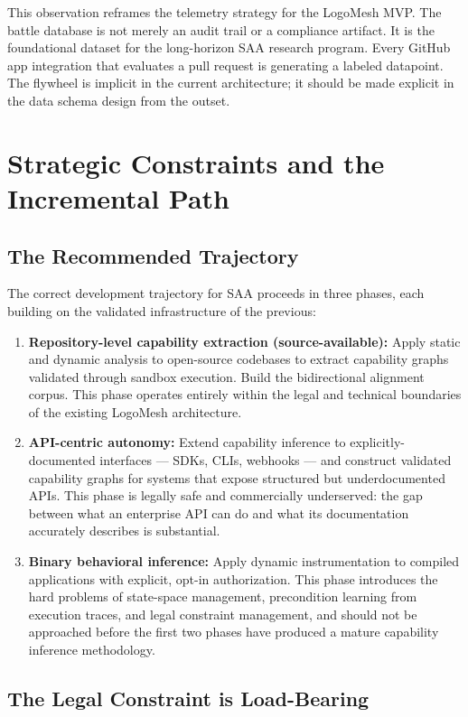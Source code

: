 \documentclass[11pt, a4paper]{article}
\begin{document}
This observation reframes the telemetry strategy for the LogoMesh MVP. The battle database is not merely an audit trail or a compliance artifact. It is the foundational dataset for the long-horizon SAA research program. Every GitHub app integration that evaluates a pull request is generating a labeled datapoint. The flywheel is implicit in the current architecture; it should be made explicit in the data schema design from the outset.

\section{Strategic Constraints and the Incremental Path}

\subsection{The Recommended Trajectory}

The correct development trajectory for SAA proceeds in three phases, each building on the validated infrastructure of the previous:

\begin{enumerate}[leftmargin=*]
  \item \textbf{Repository-level capability extraction (source-available):} Apply static and dynamic analysis to open-source codebases to extract capability graphs validated through sandbox execution. Build the bidirectional alignment corpus. This phase operates entirely within the legal and technical boundaries of the existing LogoMesh architecture.
  \item \textbf{API-centric autonomy:} Extend capability inference to explicitly-documented interfaces — SDKs, CLIs, webhooks — and construct validated capability graphs for systems that expose structured but underdocumented APIs. This phase is legally safe and commercially underserved: the gap between what an enterprise API can do and what its documentation accurately describes is substantial.
  \item \textbf{Binary behavioral inference:} Apply dynamic instrumentation to compiled applications with explicit, opt-in authorization. This phase introduces the hard problems of state-space management, precondition learning from execution traces, and legal constraint management, and should not be approached before the first two phases have produced a mature capability inference methodology.
\end{enumerate}

\subsection{The Legal Constraint is Load-Bearing}
\end{document}
